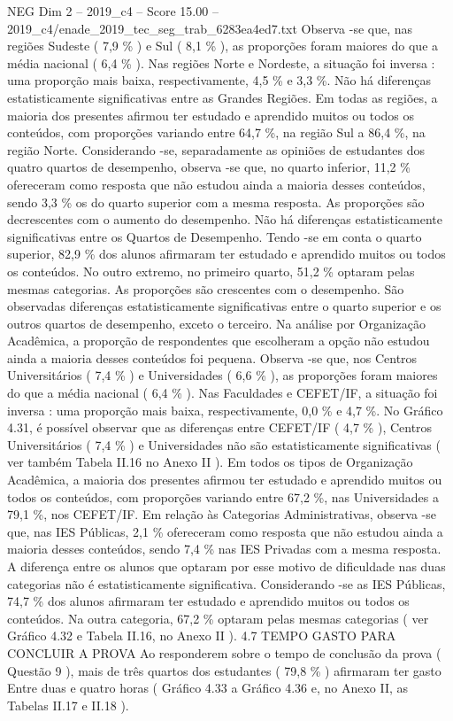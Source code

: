 \begin{textsample}{NEG Dim 2 – 2019\_c4 – Score 15.00 – 2019\_c4/enade\_2019\_tec\_seg\_trab\_6283ea4ed7.txt}
Observa -se que, nas regiões Sudeste ( 7,9 \% ) e Sul ( 8,1 \% ), as proporções foram maiores do que a média nacional ( 6,4 \% ).
Nas regiões Norte e Nordeste, a situação foi inversa : uma proporção mais baixa, respectivamente, 4,5 \% e 3,3 \%.
Não há diferenças estatisticamente significativas entre as Grandes Regiões.
Em todas as regiões, a maioria dos presentes afirmou ter estudado e aprendido muitos ou todos os conteúdos, com proporções variando entre 64,7 \%, na região Sul a 86,4 \%, na região Norte.
Considerando -se, separadamente as opiniões de estudantes dos quatro quartos de desempenho, observa -se que, no quarto inferior, 11,2 \% ofereceram como resposta que não estudou ainda a maioria desses conteúdos, sendo 3,3 \% os do quarto superior com a mesma resposta.
As proporções são decrescentes com o aumento do desempenho.
Não há diferenças estatisticamente significativas entre os Quartos de Desempenho.
Tendo -se em conta o quarto superior, 82,9 \% dos alunos afirmaram ter estudado e aprendido muitos ou todos os conteúdos.
No outro extremo, no primeiro quarto, 51,2 \% optaram pelas mesmas categorias.
As proporções são crescentes com o desempenho.
São observadas diferenças estatisticamente significativas entre o quarto superior e os outros quartos de desempenho, exceto o terceiro.
Na análise por Organização Acadêmica, a proporção de respondentes que escolheram a opção não estudou ainda a maioria desses conteúdos foi pequena.
Observa -se que, nos Centros Universitários ( 7,4 \% ) e Universidades ( 6,6 \% ), as proporções foram maiores do que a média nacional ( 6,4 \% ).
Nas Faculdades e CEFET/IF, a situação foi inversa : uma proporção mais baixa, respectivamente, 0,0 \% e 4,7 \%.
No Gráfico 4.31, é possível observar que as diferenças entre CEFET/IF ( 4,7 \% ), Centros Universitários ( 7,4 \% ) e Universidades não são estatisticamente significativas ( ver também Tabela II.16 no Anexo II ).
Em todos os tipos de Organização Acadêmica, a maioria dos presentes afirmou ter estudado e aprendido muitos ou todos os conteúdos, com proporções variando entre 67,2 \%, nas Universidades a 79,1 \%, nos CEFET/IF.
Em relação às Categorias Administrativas, observa -se que, nas IES Públicas, 2,1 \% ofereceram como resposta que não estudou ainda a maioria desses conteúdos, sendo 7,4 \% nas IES Privadas com a mesma resposta.
A diferença entre os alunos que optaram por esse motivo de dificuldade nas duas categorias não é estatisticamente significativa.
Considerando -se as IES Públicas, 74,7 \% dos alunos afirmaram ter estudado e aprendido muitos ou todos os conteúdos.
Na outra categoria, 67,2 \% optaram pelas mesmas categorias ( ver Gráfico 4.32 e Tabela II.16, no Anexo II ). 4.7 TEMPO GASTO PARA CONCLUIR A PROVA Ao responderem sobre o tempo de conclusão da prova ( Questão 9 ), mais de três quartos dos estudantes ( 79,8 \% ) afirmaram ter gasto Entre duas e quatro horas ( Gráfico 4.33 a Gráfico 4.36 e, no Anexo II, as Tabelas II.17 e II.18 ).

\end{textsample}
